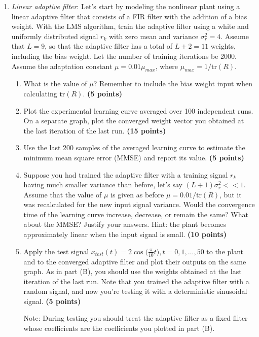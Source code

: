 \documentclass[10pt]{article}
\begin{document}
\begin{enumerate}
	\item\textit{Linear adaptive filter}: Let's start by modeling the nonlinear plant using a linear adaptive filter that consists of a FIR filter with the addition of a bias weight. With the LMS algorithm, train the adaptive filter using a white and uniformly distributed signal $r_k$ with zero mean and variance $\sigma_r^2 = 4$. Assume that $L = 9$, so that the adaptive filter has a total of $L+2 = 11$ weights, including the bias weight. Let the number of training iterations be 2000. Assume the adaptation constant $\mu = 0.01\mu_{max}$, where $\mu_{max} = 1/\mathrm{tr}(R)$. 
	\begin{enumerate}[label=\textbf{(\Alph*)}]
		\item What is the value of $\mu$? Remember to include the bias weight input when calculating $\mathrm{tr}(R)$. \textbf{(5 points)}
		\item Plot the experimental learning curve averaged over 100 independent runs. On a separate graph, plot the converged weight vector you obtained at the last iteration of the last run. \textbf{(15 points)}
		\item Use the last 200 samples of the averaged learning curve to estimate the minimum mean square error (MMSE) and report its value. \textbf{(5 points)}
		\item Suppose you had trained the adaptive filter with a training signal $r_k$ having much smaller variance than before, let's say $(L+1)\sigma_r^2 << 1$. Assume that the value of $\mu$ is given as before $\mu = 0.01/\mathrm{tr}(R)$, but it was recalculated for the new input signal variance. Would the convergence time of the learning curve increase, decrease, or remain the same? What about the MMSE? Justify your answers. Hint: the plant becomes approximately linear when the input signal is small.  \textbf{(10 points)}
		\item Apply the test signal $x_{test}(t) = 2\cos\big(\frac{\pi}{10} t\big), t = 0, 1,\ldots, 50$ to the plant and to the converged adaptive filter and plot their outputs on the same graph. As in part (B), you should use the weights obtained at the last iteration of the last run. Note that you trained the adaptive filter with a random signal, and now you're testing it with a deterministic sinusoidal signal. \textbf{(5 points)}
		
		Note: During testing you should treat the adaptive filter as a fixed filter whose coefficients are the coefficients you plotted in part (B).
	\end{enumerate}
		

\end{enumerate}
\end{document}
